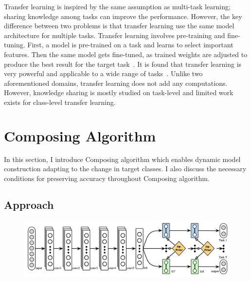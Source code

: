 \documentclass{article}
\begin{document}
Transfer learning is inspired by the same assumption as multi-task learning; sharing knowledge among tasks can improve the performance. However, the key difference between two problems is that transfer learning use the same model architecture for multiple tasks. Transfer learning involves pre-training and fine-tuning. First, a model is pre-trained on a task and learns to select important features. Then the same model gets fine-tuned, as trained weights are adjusted to produce the best result for the target task~\cite{yosinski2014transferable}. It is found that transfer learning is very powerful and applicable to a wide range of tasks~\cite{raina2007self, egan2004effects, glorot2011domain}. Unlike two aforementioned domains, transfer learning does not add any computations. However, knowledge sharing is mostly studied on task-level and limited work exists for class-level transfer learning.

\section{Composing Algorithm}

In this section, I introduce Composing algorithm which enables dynamic model construction adapting to the change in target classes. I also discuss the necessary conditions for preserving accuracy throughout Composing algorithm.

\subsection{Approach}

\begin{figure}[t!]
  \centering
  \includegraphics[scale=0.25,trim={0mm 0mm 0mm 0mm},clip]{long2017learning.png}
\end{figure}
\end{document}

